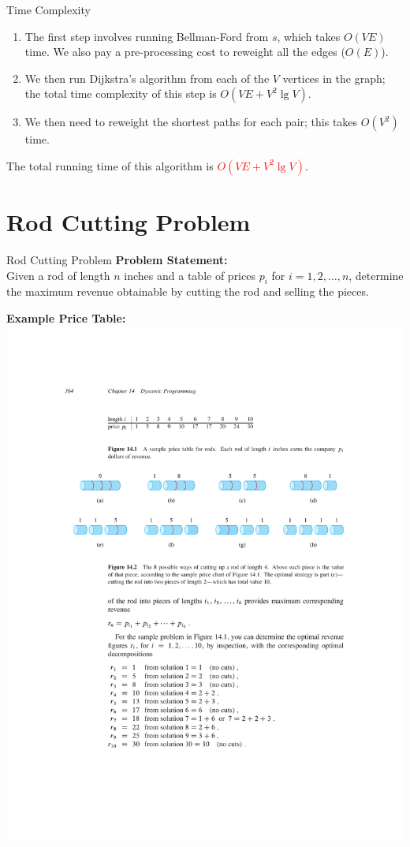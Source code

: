 \documentclass[aspectratio=169]{beamer}
\begin{document}
\begin{frame}{Time Complexity}
    \begin{enumerate}
        \item The ﬁrst step involves running Bellman-Ford from $s$, which takes $O(VE)$ time.  We also pay a pre-processing cost to reweight all the edges ($O(E)$). \pause
        \item We then run Dijkstra's algorithm from each of the $V$ vertices in the graph; the total time complexity of this step is $O(VE + V^2 \lg V)$. \pause
        \item We then need to reweight the shortest paths for each pair; this takes $O(V^2)$ time. \pause
    \end{enumerate}
    The total running time of this algorithm is \textcolor{red}{$O(VE + V^2 \lg V)$}.
\end{frame}

\section{Rod Cutting Problem}

\begin{frame}{Rod Cutting Problem}
    \textbf{Problem Statement:}\\
    Given a rod of length $n$ inches and a table of prices $p_i$ for $i = 1, 2, \dots, n$, determine the maximum revenue obtainable by cutting the rod and selling the pieces.

    \vspace{1em}
    \textbf{Example Price Table:}
    \centering
    \includegraphics[width=\textwidth,clip=true,trim=5cm 22cm 8cm 4.5cm]{figures/p364}
\end{frame}
\end{document}
